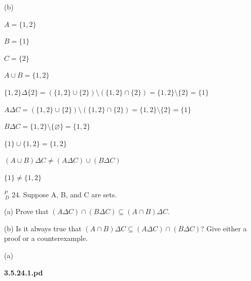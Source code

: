 \documentclass{article}
\begin{document}
\vspace{30pt}

(b)

$A = \{1,2\}$

$B = \{1\}$

$C = \{2\}$

$A \cup B = \{1, 2\}$

$\{1,2\} \Delta \{2\} = (\{1,2\} \cup \{2\}) \setminus (\{1,2\} \cap \{2\}) = \{1,2\} \setminus \{2\} = \{1\}$

$A \Delta C = (\{1,2\} \cup \{2\}) \setminus (\{1,2\} \cap \{2\}) = \{1,2\} \setminus \{2\} = \{1\}$

$B \Delta C = \{1,2\} \setminus \{\varnothing\} = \{1,2\}$

$\{1\} \cup \{1,2\} = \{1,2\}$

$(A \cup B) \Delta C \neq (A \Delta C) \cup (B \Delta C)$

$\{1\} \neq \{1,2\}$


\vspace{30pt}

$^{\textit{P}}_{\, \textit{D}}$ 24. Suppose A, B, and C are sets.

\hspace{12pt}(a) Prove that $(A \Delta C) \cap (B \Delta C) \subseteq (A \cap B) \Delta C$.

\hspace{12pt}(b) Is it always true that $(A \cap B) \Delta C \subseteq (A \Delta C) \cap (B \Delta C)$? Give
either a proof or a counterexample.

\vspace{30pt}

(a)

\textbf{3.5.24.1.pd}
\vspace{10pt}
\end{document}
